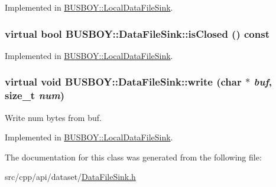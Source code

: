 Implemented in \hyperlink{classBUSBOY_1_1LocalDataFileSink_a4f02e74ccc66d094135957cd1761457e}{BUSBOY::LocalDataFileSink}.\hypertarget{classBUSBOY_1_1DataFileSink_a0c3277901c45d1476b7b2cb8bc67664e}{
\subsubsection[{isClosed}]{\setlength{\rightskip}{0pt plus 5cm}virtual bool BUSBOY::DataFileSink::isClosed () const}}
\label{classBUSBOY_1_1DataFileSink_a0c3277901c45d1476b7b2cb8bc67664e}


Implemented in \hyperlink{classBUSBOY_1_1LocalDataFileSink_aaf46e7aa06db39f9a702cae3054c58e3}{BUSBOY::LocalDataFileSink}.\hypertarget{classBUSBOY_1_1DataFileSink_a5db7ff2ea8f54f197a99261a63fd2f9a}{
\subsubsection[{write}]{\setlength{\rightskip}{0pt plus 5cm}virtual void BUSBOY::DataFileSink::write (char $\ast$ {\em buf}, \/  size\_\-t {\em num})}}
\label{classBUSBOY_1_1DataFileSink_a5db7ff2ea8f54f197a99261a63fd2f9a}


Write num bytes from buf. 

Implemented in \hyperlink{classBUSBOY_1_1LocalDataFileSink_a97aee92204860bb3f433f8b1520fd93b}{BUSBOY::LocalDataFileSink}.

The documentation for this class was generated from the following file:\begin{DoxyCompactItemize}
\item 
src/cpp/api/dataset/\hyperlink{DataFileSink_8h}{DataFileSink.h}\end{DoxyCompactItemize}
